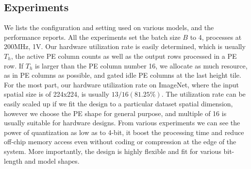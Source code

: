 \subsection{Experiments} 
We lists the configuration and setting used on various models, and the performance reports. All the experiments set the batch size $B$ to 4, processes at 200MHz, 1V. Our hardware utilization rate is easily determined, which is usually $T_h$, the active PE column counts as well as the output rows processed in a PE row. If $T_h$ is larger than the PE column number 16, we allocate as much resource, as in PE columns as possible, and gated idle PE columns at the last height tile. For the most part, our hardware utilization rate on ImageNet, where the input spatial size is of 224x224, is usually $13/16(81.25\%)$. The utilization rate can be easily scaled up if we fit the design to a particular dataset spatial dimension, however we choose the PE shape for general purpose, and multiple of 16 is usually suitable for hardware designs. From various experiments we can see the power of quantization as low as to 4-bit, it boost the processing time and reduce off-chip memory access even without coding or compression at the edge of the system. More importantly, the design is highly flexible and fit for various bit-length and model shapes. \\


